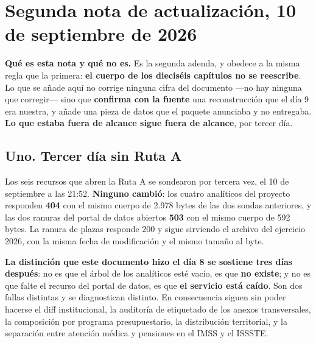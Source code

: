 \chapter*{Segunda nota de actualización, 10 de septiembre de 2026}


\textbf{Qué es esta nota y qué no es.} Es la segunda adenda, y obedece a la misma regla que
la primera: \textbf{el cuerpo de los dieciséis capítulos no se reescribe}. Lo que se añade
aquí no corrige ninguna cifra del documento ---no hay ninguna que corregir--- sino que
\textbf{confirma con la fuente} una reconstrucción que el día 9 era nuestra, y añade una
pieza de datos que el paquete anunciaba y no entregaba. \textbf{Lo que estaba fuera de
alcance sigue fuera de alcance}, por tercer día.

\section*{Uno. Tercer día sin Ruta A}

Los seis recursos que abren la Ruta A se sondearon por tercera vez, el 10 de septiembre a las
21:52. \textbf{Ninguno cambió}: los cuatro analíticos del proyecto responden \textbf{404} con
el mismo cuerpo de 2.978 bytes de las dos sondas anteriores, y las dos ranuras del portal de
datos abiertos \textbf{503} con el mismo cuerpo de 592 bytes. La ranura de plazas responde
200 y sigue sirviendo el archivo del ejercicio 2026, con la misma fecha de modificación y el
mismo tamaño al byte.

\textbf{La distinción que este documento hizo el día 8 se sostiene tres días después}: no es
que el árbol de los analíticos esté vacío, es que \textbf{no existe}; y no es que falte el
recurso del portal de datos, es que \textbf{el servicio está caído}. Son dos fallas distintas
y se diagnostican distinto. En consecuencia siguen sin poder hacerse el diff institucional,
la auditoría de etiquetado de los anexos transversales, la composición por programa
presupuestario, la distribución territorial, y la separación entre atención médica y
pensiones en el IMSS y el ISSSTE.

